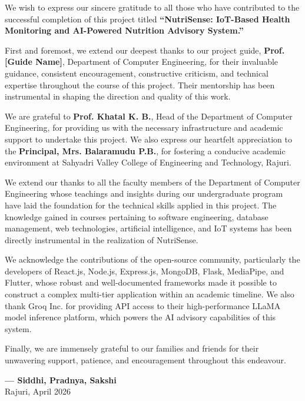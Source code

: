 \documentclass[12pt,a4paper]{report}
\begin{document}
We wish to express our sincere gratitude to all those who have contributed to the successful completion of this project titled \textbf{``NutriSense: IoT-Based Health Monitoring and AI-Powered Nutrition Advisory System.''}

First and foremost, we extend our deepest thanks to our project guide, \textbf{Prof. [Guide Name]}, Department of Computer Engineering, for their invaluable guidance, consistent encouragement, constructive criticism, and technical expertise throughout the course of this project. Their mentorship has been instrumental in shaping the direction and quality of this work.

We are grateful to \textbf{Prof. Khatal K. B.}, Head of the Department of Computer Engineering, for providing us with the necessary infrastructure and academic support to undertake this project. We also express our heartfelt appreciation to the \textbf{Principal, Mrs. Balaramudu P.B.}, for fostering a conducive academic environment at Sahyadri Valley College of Engineering and Technology, Rajuri.

We extend our thanks to all the faculty members of the Department of Computer Engineering whose teachings and insights during our undergraduate program have laid the foundation for the technical skills applied in this project. The knowledge gained in courses pertaining to software engineering, database management, web technologies, artificial intelligence, and IoT systems has been directly instrumental in the realization of NutriSense.

We acknowledge the contributions of the open-source community, particularly the developers of React.js, Node.js, Express.js, MongoDB, Flask, MediaPipe, and Flutter, whose robust and well-documented frameworks made it possible to construct a complex multi-tier application within an academic timeline. We also thank Groq Inc. for providing API access to their high-performance LLaMA model inference platform, which powers the AI advisory capabilities of this system.

Finally, we are immensely grateful to our families and friends for their unwavering support, patience, and encouragement throughout this endeavour.

\vspace{1.5cm}
\begin{flushright}
\textbf{--- Siddhi, Pradnya, Sakshi}\\
Rajuri, April 2026
\end{flushright}
\end{document}
